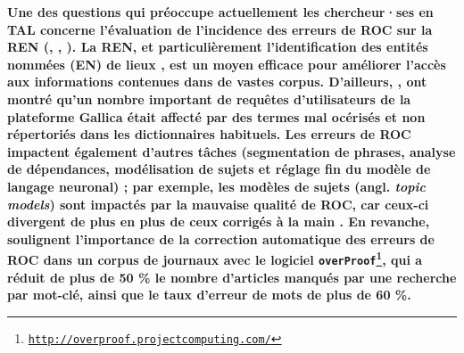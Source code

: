 \textbf{Une des questions qui préoccupe actuellement les chercheur·ses en TAL concerne l’évaluation de l’incidence des erreurs de ROC sur la REN (\cite{chiron:hal-03025508}, \cite{hamdi:hal-03026931}, \cite{DBLP:journals/corr/abs-2302-10204}). %
La REN, et particulièrement l’identification des entités nommées (EN) de lieux \cite{vanStrien-2020}, est un moyen efficace pour améliorer l’accès aux informations contenues dans de vastes corpus.
D'ailleurs, \cite{chiron:hal-03025508}, ont montré qu'un nombre important de requêtes d'utilisateurs de la plateforme Gallica était affecté par des termes mal océrisés et non répertoriés dans les dictionnaires habituels. 
Les erreurs de ROC impactent également d'autres tâches (segmentation de phrases, analyse de dépendances, modélisation de sujets et réglage fin du modèle de langage neuronal) ; par exemple, les \og{}modèles de sujets\fg{} (angl. \textit{topic models}) sont impactés par la mauvaise qualité de ROC, car ceux-ci divergent de plus en plus de ceux corrigés à la main \cite{vanStrien-2020}.
En revanche, \cite{evershed2014correcting} soulignent l'importance de la correction automatique des erreurs de ROC dans un corpus de journaux avec le logiciel \texttt{overProof\footnote{\url{http://overproof.projectcomputing.com/}}}, qui a réduit de plus de 50 \% le nombre d'articles manqués par une recherche par mot-clé, ainsi que le taux d'erreur de mots de plus de 60 \%.}

